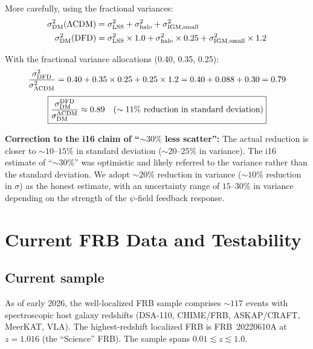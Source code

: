 \documentclass[11pt]{article}
\newcommand{\LCDM}{$\Lambda$CDM}
\begin{document}
More carefully, using the fractional variances:
\begin{align}
\sigma_{\rm DM}^2(\text{\LCDM}) &= \sigma_{\rm LSS}^2 + \sigma_{\rm halo}^2
+ \sigma_{\rm IGM,small}^2 \\
\sigma_{\rm DM}^2(\text{DFD}) &= \sigma_{\rm LSS}^2 \times 1.0
+ \sigma_{\rm halo}^2 \times 0.25
+ \sigma_{\rm IGM,small}^2 \times 1.2
\end{align}

With the fractional variance allocations (0.40, 0.35, 0.25):
\begin{equation}
\frac{\sigma^2_{\rm DFD}}{\sigma^2_{\rm \Lambda CDM}}
= 0.40 + 0.35 \times 0.25 + 0.25 \times 1.2
= 0.40 + 0.088 + 0.30 = 0.79
\end{equation}
\begin{equation}
\boxed{
\frac{\sigma_{\rm DM}^{\rm DFD}}{\sigma_{\rm DM}^{\rm \Lambda CDM}}
\approx 0.89
\quad\text{($\sim 11\%$ reduction in standard deviation)}
}
\end{equation}

\textbf{Correction to the i16 claim of ``$\sim 30\%$ less scatter'':}
The actual reduction is closer to $\sim 10$--$15\%$ in standard
deviation ($\sim 20$--$25\%$ in variance).  The i16 estimate of
``$\sim 30\%$'' was optimistic and likely referred to the variance
rather than the standard deviation.  We adopt $\sim 20\%$ reduction
in variance ($\sim 10\%$ reduction in $\sigma$) as the honest estimate,
with an uncertainty range of $15$--$30\%$ in variance depending on
the strength of the $\psi$-field feedback response.

\section{Current FRB Data and Testability}
\label{sec:data}

\subsection{Current sample}

As of early 2026, the well-localized FRB sample comprises
$\sim 117$ events with spectroscopic host galaxy redshifts (DSA-110,
CHIME/FRB, ASKAP/CRAFT, MeerKAT, VLA).  The highest-redshift
localized FRB is FRB~20220610A at $z = 1.016$ (the ``Science'' FRB).
The sample spans $0.01 \lesssim z \lesssim 1.0$.
\end{document}
